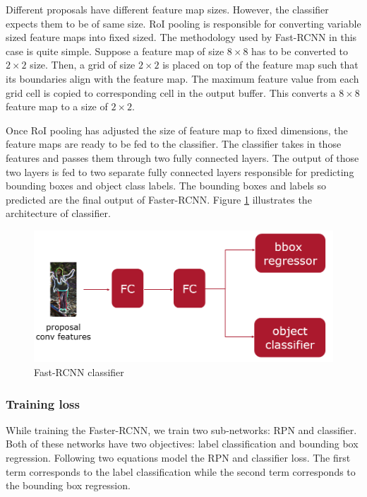 Different proposals have different feature map sizes. However, the classifier expects them to be of same size. RoI pooling is responsible for converting variable sized feature maps into fixed sized. The methodology used by Fast-RCNN in this case is quite simple. Suppose a feature map of size $8\times 8$ has to be converted to $2 \times 2$ size. Then, a grid of size $2 \times 2$ is placed on top of the feature map such that its boundaries align with the feature map. The maximum feature value from each grid cell is copied to corresponding cell in the output buffer. This converts a $8\times 8$ feature map to a size of $2 \times 2$.

Once RoI pooling has adjusted the size of feature map to fixed dimensions, the feature maps are ready to be fed to the classifier. The classifier takes in those features and passes them through two fully connected layers. The output of those two layers is fed to two separate fully connected layers responsible for predicting bounding boxes and object class labels. The bounding boxes and labels so predicted are the final output of Faster-RCNN. Figure \ref{fig:classifier} illustrates the architecture of classifier.

\begin{figure}
    \centering
    \includegraphics[width=\linewidth]{images/classifier.PNG}
    \caption{Fast-RCNN classifier}
    \label{fig:classifier}
\end{figure}

\subsubsection{Training loss}
While training the Faster-RCNN, we train two sub-networks: RPN and classifier. Both of these networks have two objectives: label classification and bounding box regression. Following two equations model the RPN and classifier loss. The first term corresponds to the label classification while the second term corresponds to the bounding box regression. 

